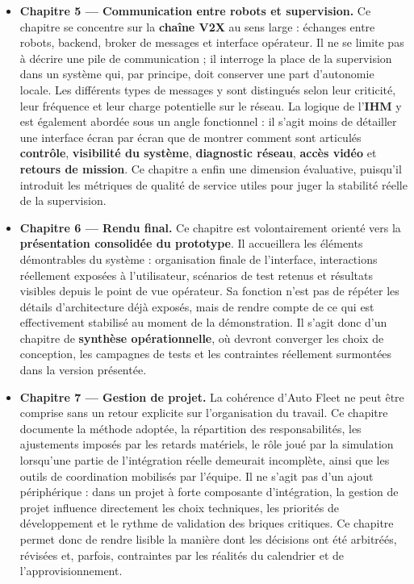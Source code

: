 \documentclass[11pt,a4paper]{report}
\newcommand{\kw}[1]{\textbf{#1}}
\begin{document}
\begin{itemize}[leftmargin=1.2cm]
    \item \kw{Chapitre 5 --- Communication entre robots et supervision.}  
    Ce chapitre se concentre sur la \kw{chaîne V2X} au sens large : échanges entre robots, backend, broker de messages et interface opérateur. Il ne se limite pas à décrire une pile de communication ; il interroge la place de la supervision dans un système qui, par principe, doit conserver une part d’autonomie locale. Les différents types de messages y sont distingués selon leur criticité, leur fréquence et leur charge potentielle sur le réseau. La logique de l’\kw{IHM} y est également abordée sous un angle fonctionnel : il s’agit moins de détailler une interface écran par écran que de montrer comment sont articulés \kw{contrôle}, \kw{visibilité du système}, \kw{diagnostic réseau}, \kw{accès vidéo} et \kw{retours de mission}. Ce chapitre a enfin une dimension évaluative, puisqu’il introduit les métriques de qualité de service utiles pour juger la stabilité réelle de la supervision.

    \item \kw{Chapitre 6 --- Rendu final.}  
    Ce chapitre est volontairement orienté vers la \kw{présentation consolidée du prototype}. Il accueillera les éléments démontrables du système : organisation finale de l’interface, interactions réellement exposées à l’utilisateur, scénarios de test retenus et résultats visibles depuis le point de vue opérateur. Sa fonction n’est pas de répéter les détails d’architecture déjà exposés, mais de rendre compte de ce qui est effectivement stabilisé au moment de la démonstration. Il s’agit donc d’un chapitre de \kw{synthèse opérationnelle}, où devront converger les choix de conception, les campagnes de tests et les contraintes réellement surmontées dans la version présentée.

    \item \kw{Chapitre 7 --- Gestion de projet.}  
    La cohérence d’Auto Fleet ne peut être comprise sans un retour explicite sur l’organisation du travail. Ce chapitre documente la méthode adoptée, la répartition des responsabilités, les ajustements imposés par les retards matériels, le rôle joué par la simulation lorsqu’une partie de l’intégration réelle demeurait incomplète, ainsi que les outils de coordination mobilisés par l’équipe. Il ne s’agit pas d’un ajout périphérique : dans un projet à forte composante d’intégration, la gestion de projet influence directement les choix techniques, les priorités de développement et le rythme de validation des briques critiques. Ce chapitre permet donc de rendre lisible la manière dont les décisions ont été arbitréés, révisées et, parfois, contraintes par les réalités du calendrier et de l’approvisionnement.


\end{itemize}
\end{document}
